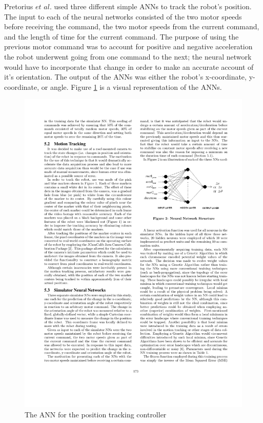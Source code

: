 \documentclass{sig-alternate}
\begin{document}
  Pretorius $et$ $al.$ used three different simple ANNs to track the robot's position. The input to each of the neural networks consisted of the two motor speeds before receiving the command, the two motor speeds from the current command, and the length of time for the current command. The purpose of using the previous motor command was to account for positive and negative acceleration the robot underwent going from one command to the next; the neural network would have to incorporate that change in order to make an accurate account of it's orientation. The output of the ANNs was either the robot's x-coordinate, y-coordinate, or angle. Figure \ref{fig:ANN} is a visual representation of the ANNs.
  
\begin{figure}%
\begin{center}
  \includegraphics[scale=1]{cr2}
\caption{The ANN for the position tracking controller}
\end{center}
\label{fig:ANN}
\end{figure}
\end{document}
